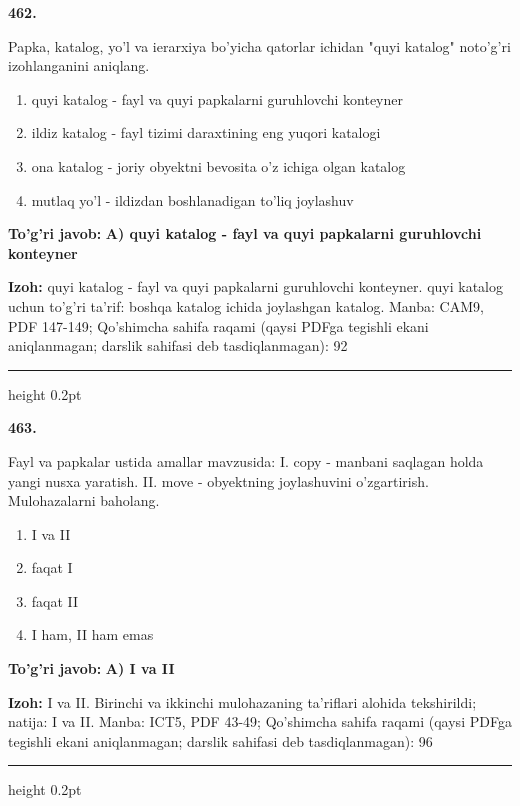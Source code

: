 \documentclass[10pt,a4paper]{article}
\begin{document}
{\bfseries\sffamily\color{ink} 462.}
\par
Papka, katalog, yo'l va ierarxiya bo'yicha qatorlar ichidan "quyi katalog" noto'g'ri izohlanganini aniqlang.
\begin{enumerate}[label=\Alph*),leftmargin=9mm]
\item quyi katalog - fayl va quyi papkalarni guruhlovchi konteyner
\item ildiz katalog - fayl tizimi daraxtining eng yuqori katalogi
\item ona katalog - joriy obyektni bevosita o'z ichiga olgan katalog
\item mutlaq yo'l - ildizdan boshlanadigan to'liq joylashuv
\end{enumerate}
\begin{tcolorbox}[enhanced,breakable,colback=teal!4,colframe=teal!60!black,boxrule=0.45pt,arc=1.2mm,left=2.7mm,right=2.7mm,top=1.8mm,bottom=1.8mm,before skip=2mm,after skip=2mm]
{\bfseries\sffamily\color{teal}To'g'ri javob:} \textbf{A) quyi katalog - fayl va quyi papkalarni guruhlovchi konteyner}
\par\smallskip
{\bfseries Izoh:} quyi katalog - fayl va quyi papkalarni guruhlovchi konteyner. quyi katalog uchun to'g'ri ta'rif: boshqa katalog ichida joylashgan katalog. Manba: CAM9, PDF 147-149; Qo'shimcha sahifa raqami (qaysi PDFga tegishli ekani aniqlanmagan; darslik sahifasi deb tasdiqlanmagan): 92
\end{tcolorbox}
\vspace{2mm}\hrule height 0.2pt\vspace{3mm}

{\bfseries\sffamily\color{ink} 463.}
\par
Fayl va papkalar ustida amallar mavzusida: I. copy - manbani saqlagan holda yangi nusxa yaratish. II. move - obyektning joylashuvini o'zgartirish. Mulohazalarni baholang.
\begin{enumerate}[label=\Alph*),leftmargin=9mm]
\item I va II
\item faqat I
\item faqat II
\item I ham, II ham emas
\end{enumerate}
\begin{tcolorbox}[enhanced,breakable,colback=teal!4,colframe=teal!60!black,boxrule=0.45pt,arc=1.2mm,left=2.7mm,right=2.7mm,top=1.8mm,bottom=1.8mm,before skip=2mm,after skip=2mm]
{\bfseries\sffamily\color{teal}To'g'ri javob:} \textbf{A) I va II}
\par\smallskip
{\bfseries Izoh:} I va II. Birinchi va ikkinchi mulohazaning ta'riflari alohida tekshirildi; natija: I va II. Manba: ICT5, PDF 43-49; Qo'shimcha sahifa raqami (qaysi PDFga tegishli ekani aniqlanmagan; darslik sahifasi deb tasdiqlanmagan): 96
\end{tcolorbox}
\vspace{2mm}\hrule height 0.2pt\vspace{3mm}
\end{document}
